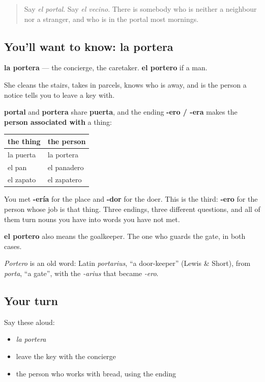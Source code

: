 \begin{quote}
Say \emph{el portal}. Say \emph{el vecino}. There is somebody who is neither a neighbour nor a stranger, and who is in the portal most mornings.
\end{quote}

\subsection*{You'll want to know: la portera}
\textbf{la portera} — the concierge, the caretaker. \textbf{el portero} if a man.

She cleans the stairs, takes in parcels, knows who is away, and is the person a notice tells you to leave a key with.

\begin{cousinweb}
\textbf{portal} and \textbf{portera} share \textbf{puerta}, and the ending \textbf{-ero / -era} makes the \textbf{person associated with} a thing:

\noindent
\begin{tabularx}{\linewidth}{@{}>{\raggedright\arraybackslash}X>{\raggedright\arraybackslash}X@{}}
\toprule
\textbf{the thing} & \textbf{the person} \\
\midrule
la puerta & la portera \\
el pan & el panadero \\
el zapato & el zapatero \\
\bottomrule
\end{tabularx}

You met \textbf{-ería} for the place and \textbf{-dor} for the doer. This is the third: \textbf{-ero} for the person whose job is that thing. Three endings, three different questions, and all of them turn nouns you have into words you have not met.

\textbf{el portero} also means the goalkeeper. The one who guards the gate, in both cases.

\emph{Portero} is an old word: Latin \emph{portarius}, \textquotedblleft{}a door-keeper\textquotedblright{} (Lewis \& Short), from \emph{porta}, \textquotedblleft{}a gate\textquotedblright{}, with the \emph{-arius} that became \emph{-ero}.
\end{cousinweb}

\subsection*{Your turn}
Say these aloud:

\begin{itemize}
\raggedright
  \item \emph{la portera}
  \item leave the key with the concierge
  \item the person who works with bread, using the ending
\end{itemize}


